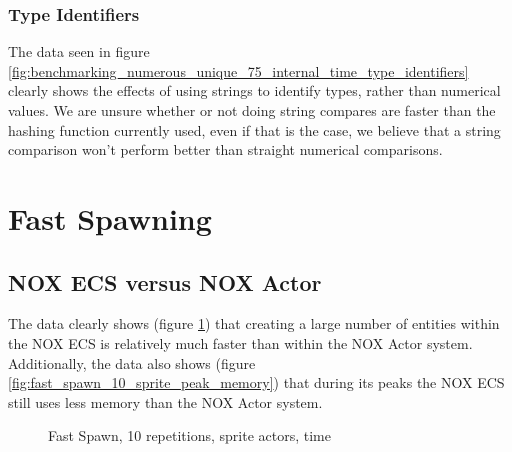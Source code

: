 \subsubsection{Type Identifiers}
The data seen in figure \ref{fig:benchmarking_numerous_unique_75_internal_time_type_identifiers} clearly shows the effects of using strings to identify
types, rather than numerical values.
We are unsure whether or not doing string compares are faster than the hashing function currently used, even if that is the case,
we believe that a string comparison won't perform better than straight numerical comparisons.

\section{Fast Spawning}
\subsection{NOX ECS versus NOX Actor}
The data clearly shows (figure \ref{fig:fast_spawn_10_sprite_time}) that creating a large number of entities within the NOX ECS is relatively much faster than within the NOX Actor system.
Additionally, the data also shows (figure \ref{fig:fast_spawn_10_sprite_peak_memory}) that during its peaks the NOX ECS still uses less memory than the NOX Actor system.

\begin{figure}[H]
\centering
{}
\caption[Fast Spawning, ECS versus Actor, 10 repetitions, sprites, time]{Fast Spawn, 10 repetitions, sprite actors, time}
\label{fig:fast_spawn_10_sprite_time}
\end{figure}

